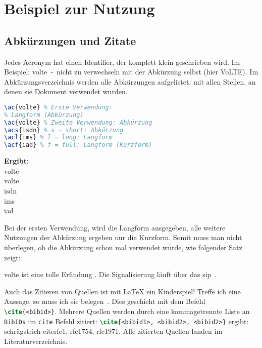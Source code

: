 \chapter{Beispiel zur Nutzung}
\section{Abkürzungen und Zitate}
Jedes Acronym hat einen Identifier, der komplett klein geschrieben wird. Im Beispiel: volte~-~nicht zu verwechseln mit der Abkürzung selbst (hier VoLTE). Im Abkürzungsverzeichnis werden alle Abkürzungen aufgelistet, mit allen Stellen, an denen sie Dokument verwendet wurden. 

\begin{minipage}{.6\textwidth}
\begin{lstlisting}[language=latex]
\ac{volte} % Erste Verwendung: 
% Langform (Abkürzung)
\ac{volte} % Zweite Verwendung: Abkürzung
\acs{isdn} % s = short: Abkürzung
\acl{ims} % l = long: Langform
\acf{iad} % f = full: Langform (Kurzform)
\end{lstlisting}   
\end{minipage}
\begin{minipage}{.4\textwidth}
	\footnotesize
	\textbf{Ergibt:}\\
	\ac{volte}\\
	\ac{volte}\\
	\acs{isdn}\\
	\acl{ims}\\
	\acf{iad} 
\end{minipage}

Bei der ersten Verwendung, wird die Langform ausgegeben, alle weitere Nutzungen der Abkürzung ergeben nur die Kurzform. Somit muss man nicht überlegen, ob die Abkürzung schon mal verwendet wurde, wie folgender Satz zeigt: 

\Ac{volte} ist eine tolle Erfindung \cite{3GPP.TS.24.228.v5.15.0}. Die Signalisierung läuft über das \ac{sip}~\cite{wikiNik}. \cite[S.~23]{fernandezgallardo_InstitutFurSoftwaretechnik_2017}
\cite[S.~50]{arnold2000java}

Auch das Zitieren von Quellen ist mit \LaTeX{} ein Kinderspiel! Treffe ich eine Aussage, so muss ich sie belegen~\cite{rfc2693}. Dies geschieht mit dem Befehl \lstinline[language=latex]|\cite{<bibid>}|. Mehrere Quellen werden durch eine kommagetrennte Liste an \texttt{BibIDs} im \texttt{cite} Befehl zitiert: \lstinline[language=latex]|\cite{<bibid1>, <bibid2>, <bibid2>}| ergibt: schrägstrich cite{rfc1, rfc1754, rfc1971}. Alle zitierten Quellen landen im Literaturverzeichnis.
